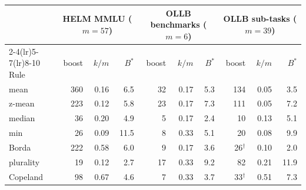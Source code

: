 \footnotesize\setlength{\tabcolsep}{3.5pt}
\begin{tabular}{@{}lrrrrrrrrr@{}}
\toprule
 & \multicolumn{3}{c}{HELM MMLU ($m{=}57$)} & \multicolumn{3}{c}{OLLB benchmarks ($m{=}6$)} & \multicolumn{3}{c}{OLLB sub-tasks ($m{=}39$)}\\
\cmidrule(lr){2-4}\cmidrule(lr){5-7}\cmidrule(lr){8-10}
Rule & boost & $k/m$ & $B^\ast$ & boost & $k/m$ & $B^\ast$ & boost & $k/m$ & $B^\ast$\\
\midrule
mean & 360 & 0.16 & 6.5 & 32 & 0.17 & 5.3 & 134 & 0.05 & 3.5\\
z-mean & 223 & 0.12 & 5.8 & 23 & 0.17 & 7.3 & 111 & 0.05 & 7.2\\
median & 36 & 0.20 & 4.9 & 5 & 0.17 & 2.4 & 10 & 0.13 & 5.1\\
min & 26 & 0.09 & 11.5 & 8 & 0.33 & 5.1 & 20 & 0.08 & 9.9\\
Borda & 222 & 0.58 & 6.0 & 9 & 0.17 & 3.6 & 26$^\dagger$ & 0.10 & 2.0\\
plurality & 19 & 0.12 & 2.7 & 17 & 0.33 & 9.2 & 82 & 0.21 & 11.9\\
Copeland & 98 & 0.67 & 4.6 & 7 & 0.33 & 3.7 & 33$^\dagger$ & 0.51 & 7.3\\
\bottomrule
\end{tabular}
